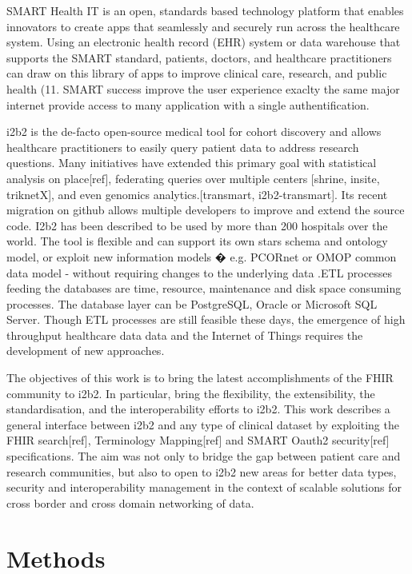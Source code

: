 \documentclass{amia}
\begin{document}
SMART Health IT is an open, standards based technology platform that enables innovators to create apps that seamlessly and securely run across the healthcare system. Using an electronic health record (EHR) system or data warehouse that supports the SMART standard, patients, doctors, and healthcare practitioners can draw on this library of apps to improve clinical care, research, and public health (11. SMART success improve the user experience exaclty the same major internet provide access to many application with a single authentification.

i2b2 is the de-facto open-source medical tool for cohort discovery and allows  healthcare practitioners to easily query patient data to address research questions. Many initiatives have extended this primary goal with statistical analysis on place[ref], federating queries over multiple centers [shrine, insite, triknetX], and even genomics analytics.[transmart, i2b2-transmart]. Its recent migration on github allows multiple developers to improve and extend the source code. I2b2 has been described to be used by more than 200 hospitals over the world. The tool is flexible and can support its own stars schema and ontology model, or exploit new information models � e.g. PCORnet  or OMOP common data model - without requiring changes to the underlying data .ETL processes feeding the databases are time, resource, maintenance and disk space consuming processes. The database layer can be PostgreSQL, Oracle or Microsoft SQL Server. Though ETL processes are still feasible these days, the emergence of high throughput healthcare data data and the Internet of Things requires the development of new approaches.

The objectives of this work is to bring the latest accomplishments of the FHIR community to i2b2. In particular, bring the flexibility, the extensibility, the standardisation, and the interoperability efforts to i2b2.
This work describes a general interface between i2b2 and any type of clinical dataset by exploiting the FHIR search[ref], Terminology Mapping[ref] and SMART Oauth2 security[ref] specifications. The aim was not only to bridge the gap between patient care and research communities, but also to open to i2b2 new areas for better data types, security and interoperability management in the context of scalable solutions for cross border and cross domain networking of data.

\section*{Methods}
\end{document}
